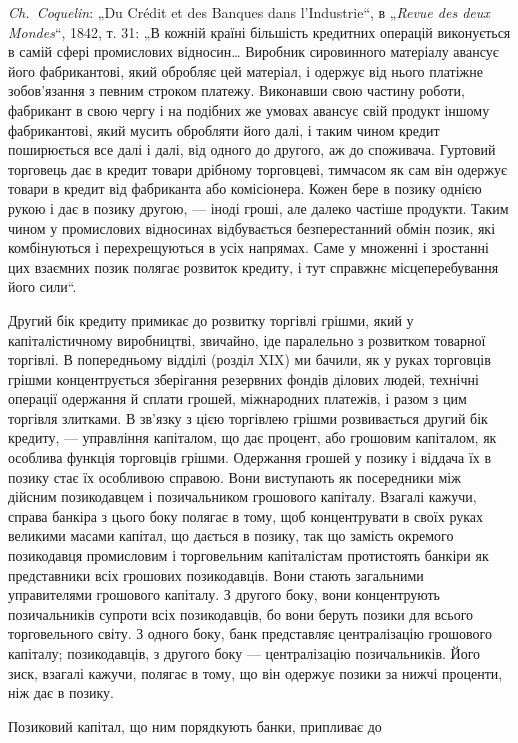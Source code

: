 \begin{small}
\emph{Ch.~Coquelin}: „Du Crédit et des Banques dans l’Industrie“, в „\emph{Revue des deux Mondes}“,
1842, т. 31: „В кожній країні більшість кредитних операцій виконується в самій
сфері промислових відносин\dots{} Виробник сировинного матеріалу авансує його
фабрикантові, який обробляє цей матеріал, і одержує від нього платіжне зобов’язання
з певним строком платежу. Виконавши свою частину роботи, фабрикант
в свою чергу і на подібних же умовах авансує свій продукт іншому фабрикантові,
який мусить обробляти його далі, і таким чином кредит поширюється все далі і
далі, від одного до другого, аж до споживача. Гуртовий торговець дає в кредит
товари дрібному торговцеві, тимчасом як сам він одержує товари в кредит
від фабриканта або комісіонера. Кожен бере в позику однією рукою і дає в
позику другою, — іноді гроші, але далеко частіше продукти. Таким чином у промислових
відносинах відбувається безперестанний обмін позик, які комбінуються
і перехрещуються в усіх напрямах. Саме у множенні і зростанні цих взаємних
позик полягає розвиток кредиту, і тут справжнє місцеперебування його сили“.
\end{small}

\noindent{}Другий бік кредиту примикає до розвитку торгівлі грішми,
який у капіталістичному виробництві, звичайно, іде паралельно
з розвитком товарної торгівлі. В попередньому відділі (розділ XIX)
ми бачили, як у руках торговців грішми концентрується зберігання
резервних фондів ділових людей, технічні операції одержання
й сплати грошей, міжнародних платежів, і разом з цим
торгівля злитками. В зв’язку з цією торгівлею грішми розвивається
другий бік кредиту, — управління капіталом, що дає процент,
або грошовим капіталом, як особлива функція торговців
грішми. Одержання грошей у позику і віддача їх в позику стає
їх особливою справою. Вони виступають як посередники між дійсним
позикодавцем і позичальником грошового капіталу. Взагалі
кажучи, справа банкіра з цього боку полягає в тому,
щоб концентрувати в своїх руках великими масами капітал, що
дається в позику, так що замість окремого позикодавця промисловим
і торговельним капіталістам протистоять банкіри як представники
всіх грошових позикодавців. Вони стають загальними
управителями грошового капіталу. З другого боку, вони концентрують
позичальників супроти всіх позикодавців, бо вони
беруть позики для всього торговельного світу. З одного боку,
банк представляє централізацію грошового капіталу; позикодавців,
з другого боку — централізацію позичальників. Його зиск,
взагалі кажучи, полягає в тому, що він одержує позики за нижчі
проценти, ніж дає в позику.

Позиковий капітал, що ним порядкують банки, припливає до
\parbreak{}  %
